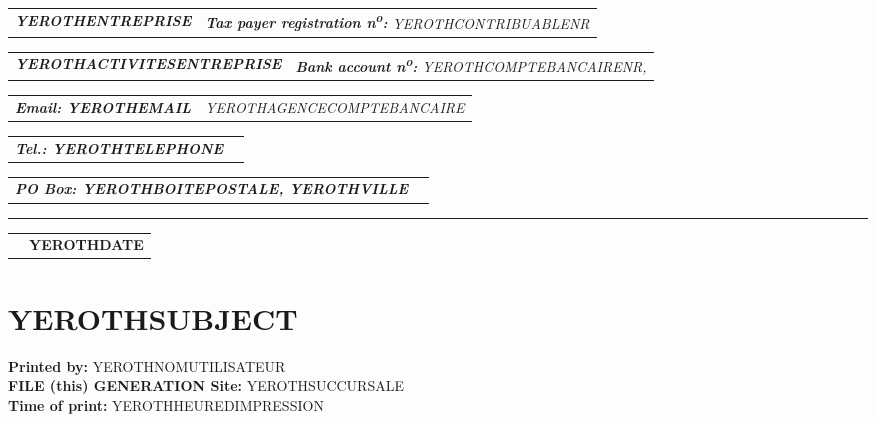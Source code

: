 \documentclass[16pt,YEROTHPAPERSPEC]{article} %
\makeatletter
\newcommand{\headerrow}[2]
{\begin{tabular*}{\linewidth}{l@{\extracolsep{\fill}}r}
	#1 &
	#2 \\
\end{tabular*}}
\newcommand{\emphbold}[1]{\textbf{\emph{#1}}\xspace}
\makeatother
\begin{document}
\bigskip

\headerrow
	{\emphbold{YEROTHENTREPRISE}}
	{\emph{\textbf{Tax payer registration n\textsuperscript{o}:} YEROTHCONTRIBUABLENR}}
\headerrow
	{\emphbold{YEROTHACTIVITESENTREPRISE}}
	{\emph{\textbf{Bank account n\textsuperscript{o}:} YEROTHCOMPTEBANCAIRENR,}}
\headerrow
	{\emphbold{Email: YEROTHEMAIL}}
	{\emph{YEROTHAGENCECOMPTEBANCAIRE}}
\headerrow
	{\emphbold{Tel.: YEROTHTELEPHONE}}
	{}
\headerrow
	{\emphbold{PO Box: YEROTHBOITEPOSTALE, YEROTHVILLE}}
	{}
	
\hrule

\headerrow
	{}
	{\textbf{YEROTHDATE}}

\section*{YEROTHSUBJECT}

\textbf{Printed by:} YEROTHNOMUTILISATEUR\\
\textbf{FILE (this) GENERATION Site:} YEROTHSUCCURSALE\\
\textbf{Time of print:} YEROTHHEUREDIMPRESSION

\vspace{0.3cm}
\end{document}

